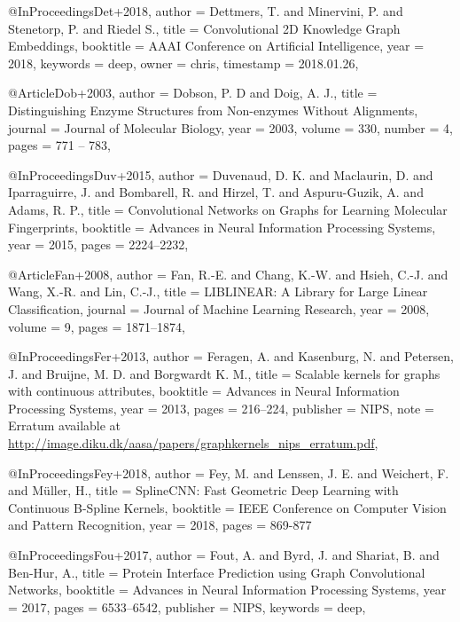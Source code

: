 @InProceedings{Det+2018,
  author    = {Dettmers, T. and Minervini, P. and Stenetorp, P. and Riedel S.},
  title     = {Convolutional 2D Knowledge Graph Embeddings},
  booktitle = {AAAI Conference on Artificial Intelligence},
  year      = {2018},
  keywords  = {deep},
  owner     = {chris},
  timestamp = {2018.01.26},
}

@Article{Dob+2003,
  author  = {Dobson, P. D and Doig, A. J.},
  title   = {Distinguishing Enzyme Structures from Non-enzymes Without Alignments},
  journal = {Journal of Molecular Biology},
  year    = {2003},
  volume  = {330},
  number  = {4},
  pages   = {771 -- 783},
}

@InProceedings{Duv+2015,
  author    = {Duvenaud, D. K. and Maclaurin, D. and Iparraguirre, J. and Bombarell, R. and Hirzel, T. and Aspuru-Guzik, A. and Adams, R. P.},
  title     = {Convolutional Networks on Graphs for Learning Molecular Fingerprints},
  booktitle = {Advances in Neural Information Processing Systems},
  year      = {2015},
  pages     = {2224--2232},
}

@Article{Fan+2008,
  author  = {Fan, R.-E. and Chang, K.-W. and Hsieh, C.-J. and Wang, X.-R. and Lin, C.-J.},
  title   = {{LIBLINEAR}: {A} Library for Large Linear Classification},
  journal = {Journal of Machine Learning Research},
  year    = {2008},
  volume  = {9},
  pages   = {1871--1874},
}

@InProceedings{Fer+2013,
  author    = {Feragen, A. and Kasenburg, N. and Petersen, J. and Bruijne, M. D. and Borgwardt K. M.},
  title     = {Scalable kernels for graphs with continuous attributes},
  booktitle = {Advances in Neural Information Processing Systems},
  year      = {2013},
  pages     = {216--224},
  publisher = {NIPS},
  note      = {Erratum available at \url{http://image.diku.dk/aasa/papers/graphkernels_nips_erratum.pdf}},
}

@InProceedings{Fey+2018,
  author    = {Fey, M. and Lenssen, J. E. and Weichert, F. and M{\"u}ller, H.},
  title     = {{SplineCNN}: Fast Geometric Deep Learning with Continuous {B}-Spline Kernels},
  booktitle = {IEEE Conference on Computer Vision and Pattern Recognition},
  year      = {2018},
  pages     = {869-877}
}

@InProceedings{Fou+2017,
  author    = {Fout, A. and Byrd, J. and Shariat, B. and Ben-Hur, A.},
  title     = {Protein Interface Prediction using Graph Convolutional Networks},
  booktitle = {Advances in Neural Information Processing Systems},
  year      = {2017},
  pages     = {6533--6542},
  publisher = {NIPS},
  keywords  = {deep},
}

